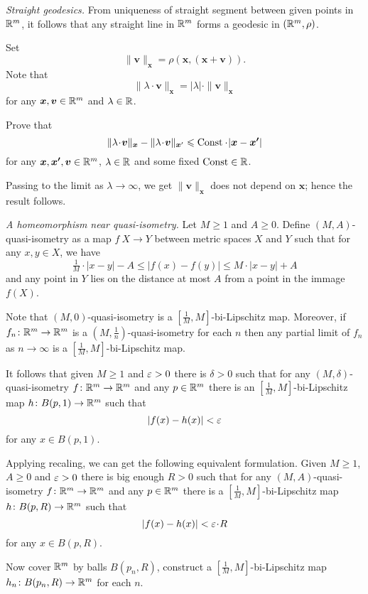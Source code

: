 \textit{Straight geodesics.}
From uniqueness of straight segment between given points in $\mathbb{R}^m$,
it follows that any straight line in $\mathbb{R}^m$ forms a geodesic in $(\mathbb{R}^m,\rho)$.

Set 
\[\|\bm{v}\|_{\bm{x}}=\rho(\bm{x},(\bm{x}+\bm{v})).\]
Note that 
\[ \|\lambda\cdot\bm{v}\|_{\bm{x}}
=
|\lambda|\cdot\|\bm{v}\|_{\bm{x}}\]
for any $\bm{x},\bm{v}\in\mathbb{R}^m$ and $\lambda\in\mathbb{R}$.

Prove that 
\[
\|\lambda\cdot\bm{v}\|_{\bm{x}}
-
\|\lambda\cdot\bm{v}\|_{\bm{x}'}
\le 
\Const\cdot |\bm{x}-\bm{x'}|\]
for any $\bm{x},\bm{x'},\bm{v}\in\mathbb{R}^m$, 
$\lambda\in\mathbb{R}$
and some fixed $\operatorname{\rm Const}\in\mathbb{R}$.

Passing to the limit as $\lambda\to\infty$, 
we get
$\|\bm{v}\|_{\bm{x}}$ does not depend on $\bm{x}$;
hence the result follows.



\textit{A homeomorphism near quasi-isometry.}
Let $M\ge 1$ and $A\ge 0$.
Define $(M,A)$-quasi-isometry
as a map $f\:X\to Y$ between metric spaces $X$ and $Y$ such that for any $x,y\in X$,
 we have
\[\tfrac1M\cdot |x-y|-A\le |f(x)-f(y)|\le M\cdot |x-y|+A\]
and any point in $Y$ lies on the distance at most $A$ from a point in the immage $f(X)$.

Note that $(M,0)$-quasi-isometry is a $[\tfrac1M,M]$-bi-Lipschitz map.
Moreover,
if $f_n\colon\mathbb{R}^m\to\mathbb{R}^m$ is a  $(M,\frac1n)$-quasi-isometry 
for each $n$ then any partial limit of $f_n$ as $n\to\infty$
is a $[\tfrac1M,M]$-bi-Lipschitz map.

It follows that given $M\ge 1$ and $\varepsilon>0$ there is $\delta>0$ such that 
for any $(M,\delta)$-quasi-isometry $f\colon\mathbb{R}^m\to\mathbb{R}^m$ and any $p\in \mathbb{R}^m$
there is an $[\tfrac1M,M]$-bi-Lipschitz map $h\colon B(p,1)\to \mathbb{R}^m$
such that
\[|f(x)-h(x)|<\varepsilon\]
for any $x\in B(p,1)$.

Applying recaling, we can get the following equivalent formulation. 
Given $M\ge 1$, $A\ge 0$ and $\varepsilon>0$
there is big enough $R>0$ such that for any $(M,A)$-quasi-isometry 
$f\colon\mathbb{R}^m\to\mathbb{R}^m$ and any $p\in\mathbb{R}^m$ there is a $[\tfrac1M,M]$-bi-Lipschitz map $h\colon B(p,R)\to \mathbb{R}^m$
such that 
\[|f(x)-h(x)|<\eps\cdot R\]
for any $x\in B(p,R)$.

Now cover $\mathbb{R}^m$ by balls
$B(p_n,R)$, construct a $[\tfrac1M,M]$-bi-Lipschitz map $h_n\colon B(p_n,R)\to \mathbb{R}^m$ for each $n$.

